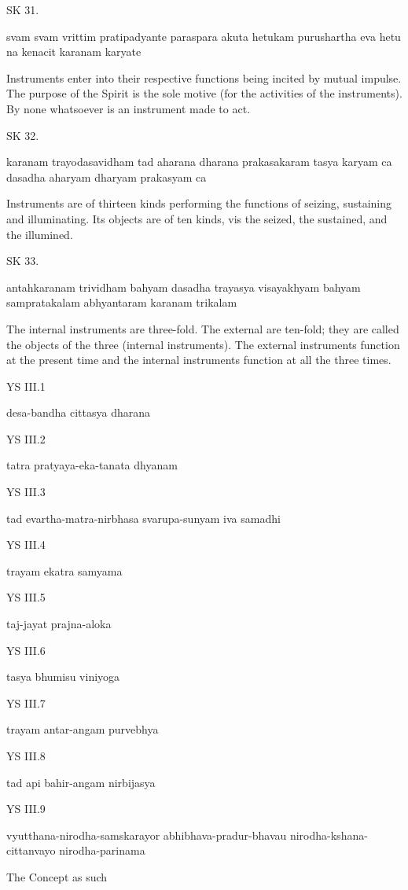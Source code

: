 SK 31.

svam svam vrittim pratipadyante paraspara akuta hetukam
purushartha eva hetu na kenacit karanam karyate

Instruments enter into their respective functions being incited by mutual impulse.
The purpose of the Spirit is the sole motive (for the activities of the instruments).
By none whatsoever is an instrument made to act.

SK 32.

karanam trayodasavidham tad aharana dharana prakasakaram
tasya karyam ca dasadha aharyam dharyam prakasyam ca

Instruments are of thirteen kinds performing the functions of
seizing, sustaining and illuminating.
Its objects are of ten kinds, vis
the seized, the sustained, and the illumined.

SK 33.

antahkaranam trividham bahyam dasadha trayasya visayakhyam  
bahyam sampratakalam abhyantaram karanam trikalam

The internal instruments are three-fold.
The external are ten-fold; they are called the objects of the three (internal instruments).
The external instruments function at the present time and
the internal instruments function at all the three times.

YS III.1

    desa-bandha cittasya dharana

YS III.2

    tatra pratyaya-eka-tanata dhyanam

YS III.3

    tad evartha-matra-nirbhasa svarupa-sunyam iva samadhi

YS III.4

    trayam ekatra samyama

YS III.5

    taj-jayat prajna-aloka

YS III.6

    tasya bhumisu viniyoga

YS III.7

    trayam antar-angam purvebhya

YS III.8

    tad api bahir-angam nirbijasya

YS III.9

    vyutthana-nirodha-samskarayor abhibhava-pradur-bhavau nirodha-kshana-cittanvayo nirodha-parinama

    The Concept as such

